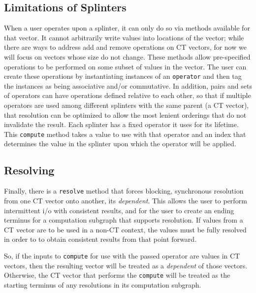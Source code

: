 \subsection{Limitations of Splinters}
When a user operates upon a splinter, it can only do so via methods
available for that vector. It cannot arbitrarily write values into locations of
the vector; while there are ways to address add and remove operations on CT
vectors, for now we will focus on vectors whose size do not change.
These methods allow pre-specified operations to be performed on some subset of
values in the vector. The user can create these operations by instantiating
instances of an \texttt{operator} and then tag the instances as being associative and/or
commutative. In addition, pairs and sets of operators can have operations
defined relative to each other, so that if multiple operators are used among
different splinters with the same parent (a CT vector), that resolution can
be optimized to allow the most lenient orderings that do not invalidate the
result. Each splinter has a fixed operator it uses for its lifetime. 
This \texttt{compute} method takes a value to use with that operator and an index that 
determines the value in the splinter upon which the operator will be applied.

\subsection{Resolving}
Finally, there is a \texttt{resolve} method that forces blocking, synchronous
resolution from one CT vector onto another, its \textit{dependent}. 
This allows the user to perform intermittent i/o
with consistent results, and for the user to create an ending terminus for a
computation subgraph that supports resolution. If values from a CT vector are
to be used in a non-CT context, the values must be fully resolved in order to
to obtain consistent results from that point forward.

So, if the inputs to \texttt{compute} for use with the passed operator are values in 
CT vectors, then the resulting vector will be treated as a \textit{dependent} of those 
vectors. Otherwise, the CT vector that performs
the \texttt{compute} will be treated as the starting terminus of any resolutions in its 
computation subgraph.

